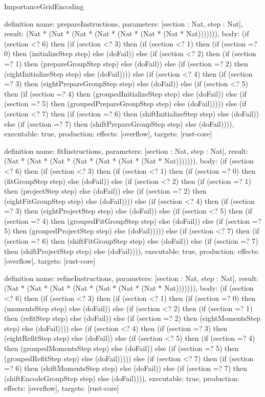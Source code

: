 \begin{lexlean}{ImportanceGridEncoding}
\begin{semanticmodule}
definition{
  name: prepareInstructions,
  parameters: [section : Nat, step : Nat],
  result: (Nat * (Nat * (Nat * (Nat * (Nat * (Nat * (Nat * Nat))))))),
  body: (if (section <? 6) then (if (section <? 3) then
      (if (section <? 1) then
      (if (section =? 0) then (initializeStep step) else (doFail)) else
      (if (section <? 2) then
      (if (section =? 1) then (prepareGroupStep step) else (doFail)) else
      (if (section =? 2) then (eightInitializeStep step) else (doFail)))) else
      (if (section <? 4) then
      (if (section =? 3) then (eightPrepareGroupStep step) else (doFail)) else
      (if (section <? 5) then
      (if (section =? 4) then (groupedInitializeStep step) else (doFail)) else
      (if (section =? 5) then (groupedPrepareGroupStep step) else (doFail))))) else (if (section <? 7) then
      (if (section =? 6) then (shiftInitializeStep step) else (doFail)) else
      (if (section =? 7) then (shiftPrepareGroupStep step) else (doFail)))),
  executable: true,
  production: {effects: [overflow], targets: [rust-core]}
}

definition{
  name: fitInstructions,
  parameters: [section : Nat, step : Nat],
  result: (Nat * (Nat * (Nat * (Nat * (Nat * (Nat * (Nat * Nat))))))),
  body: (if (section <? 6) then (if (section <? 3) then
      (if (section <? 1) then
      (if (section =? 0) then (fitGroupStep step) else (doFail)) else
      (if (section <? 2) then
      (if (section =? 1) then (projectStep step) else (doFail)) else
      (if (section =? 2) then (eightFitGroupStep step) else (doFail)))) else
      (if (section <? 4) then
      (if (section =? 3) then (eightProjectStep step) else (doFail)) else
      (if (section <? 5) then
      (if (section =? 4) then (groupedFitGroupStep step) else (doFail)) else
      (if (section =? 5) then (groupedProjectStep step) else (doFail))))) else (if (section <? 7) then
      (if (section =? 6) then (shiftFitGroupStep step) else (doFail)) else
      (if (section =? 7) then (shiftProjectStep step) else (doFail)))),
  executable: true,
  production: {effects: [overflow], targets: [rust-core]}
}

definition{
  name: refineInstructions,
  parameters: [section : Nat, step : Nat],
  result: (Nat * (Nat * (Nat * (Nat * (Nat * (Nat * (Nat * Nat))))))),
  body: (if (section <? 6) then (if (section <? 3) then
      (if (section <? 1) then
      (if (section =? 0) then (momentsStep step) else (doFail)) else
      (if (section <? 2) then
      (if (section =? 1) then (refitStep step) else (doFail)) else
      (if (section =? 2) then (eightMomentsStep step) else (doFail)))) else
      (if (section <? 4) then
      (if (section =? 3) then (eightRefitStep step) else (doFail)) else
      (if (section <? 5) then
      (if (section =? 4) then (groupedMomentsStep step) else (doFail)) else
      (if (section =? 5) then (groupedRefitStep step) else (doFail))))) else (if (section <? 7) then
      (if (section =? 6) then (shiftMomentsStep step) else (doFail)) else
      (if (section =? 7) then (shiftEncodeGroupStep step) else (doFail)))),
  executable: true,
  production: {effects: [overflow], targets: [rust-core]}
}


\end{semanticmodule}
\end{lexlean}
